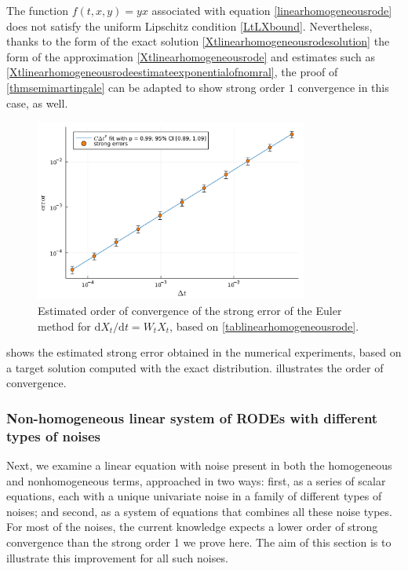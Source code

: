 \documentclass[reqno,12pt]{amsart}
\theoremstyle{plain} %
\theoremstyle{definition} %
\begin{document}
The function $f(t, x, y) = yx$ associated with equation \cref{linearhomogeneousrode} does not satisfy the uniform Lipschitz condition \cref{LtLXbound}. Nevertheless, thanks to the form of the exact solution \cref{Xtlinearhomogeneousrodesolution} the form of the approximation \cref{Xtlinearhomogeneousrode} and estimates such as \cref{Xtlinearhomogeneousrodeestimateexponentialofnomral}, the proof of \cref{thmsemimartingale} can be adapted to show strong order $1$ convergence in this case, as well.

\begin{figure}[htb]
    \centerline{\includegraphics[width=0.8\textwidth]{img/order_wiener_linearhomogenous.pdf}}
    \caption{Estimated order of convergence of the strong error of the Euler method for $\mathrm{d}X_t/\mathrm{d}t = W_t X_t$, based on \cref{tablinearhomogeneousrode}.}
    \label{figlinearhomogeneousrode}
\end{figure}

 shows the estimated strong error obtained in the numerical experiments, based on a target solution computed with the exact distribution.  illustrates the order of convergence.

\subsubsection{Non-homogeneous linear system of RODEs with different types of noises}

Next, we examine a linear equation with noise present in both the homogeneous and nonhomogeneous terms, approached in two ways: first, as a series of scalar equations, each with a unique univariate noise in a family of different types of noises; and second, as a system of equations that combines all these noise types. For most of the noises, the current knowledge expects a lower order of strong convergence than the strong order 1 we prove here. The aim of this section is to illustrate this improvement for all such noises.
\end{document}
